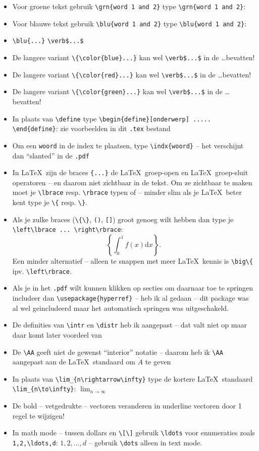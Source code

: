 \documentclass{2wa40summary}
\begin{document}
\begin{itemize}
			\item Voor groene tekst gebruik \verb$$ type \verb$\grn{word 1 and 2}$: \grn{word 1 and 2}
			\item Voor blauwe tekst gebruik \verb$$ type \verb$\blu{word 1 and 2}$: \blu{word 1 and 2}
			\item {} \verb$\blu{...}$  \verb#\verb$...$# 
			\item De langere variant \verb$\{\color{blue}...}$ kan wel \verb#\verb$...$# in de \dots bevatten!
			\item De langere variant \verb$\{\color{red}...}$ kan wel \verb#\verb$...$# in de \dots bevatten!
			\item De langere variant \verb$\{\color{green}...}$ kan wel \verb#\verb$...$# in de \dots bevatten!
			\item In plaats van \verb$\define$ type \verb$\begin{define}[onderwerp] ..... \end{define}$: zie voorbeelden in dit \verb$.tex$ bestand
			\item Om een \verb$woord$ in de index te plaatsen, type \verb$\indx{woord}$ -- het verschijnt dan ``slanted'' in de \verb$.pdf$
			\item In \LaTeX\ zijn de braces \verb${...}$ de \LaTeX\ groep-open en \LaTeX\ groep-sluit operatoren -- en daarom niet zichtbaar in de tekst. Om ze zichtbaar te maken moet je \verb$\lbrace$ resp.{} \verb$\rbrace$ typen of -- minder slim als je \LaTeX\ beter kent type je \verb$\{$ resp.{} \verb$\}$.
			\item Als je zulke braces (\verb$\{\}$, \verb$()$, \verb$[]$) groot genoeg wilt hebben dan type je \verb$\left\lbrace ... \right\rbrace$:
			\[
			\left\lbrace \int_0^1 f(x) \text{d}x \right\rbrace.
			\]
			Een minder alternatief -- alleen te snappen met meer \LaTeX\ kennis is \verb$\big\{$ ipv.{} \verb$\left\rbrace$.
			\item Als je in het \verb$.pdf$ wilt kunnen klikken op secties om daarnaar toe te springen includeer dan
			\verb$\usepackage{hyperref}$ -- heb ik al gedaan -- dit package was al wel geincludeerd maar het automatisch springen was uitgeschakeld.
			\item De definities van \verb$\intr$ en \verb$\distr$ heb ik aangepast -- dat valt niet op maar daar komt later voordeel van
			\item De \verb$\AA$ geeft niet de gewenst ``interior'' notatie -- daarom heb ik \verb$\AA$ aangepast aan de \LaTeX\ standaard
			om $\mathring{A}$ te geven
			\item In plaats van \verb$\lim_{n\rightarrow\infty}$ type de kortere \LaTeX\ standaard \verb$\lim_{n\to\infty}$: $\lim_{n\to\infty}$
			\item De bold -- vetgedrukte -- vectoren veranderen in underline vectoren door 1 regel te wijzigen!
			\item In math mode -- tussen dollars en \verb$\[\]$ gebruik \verb$\ldots$ voor enumeraties zoals \verb$1,2,\ldots,d$: $1,2,\ldots,d$ -- gebruik \verb$\dots$ alleen in text mode.
		\end{itemize}
\end{document}
